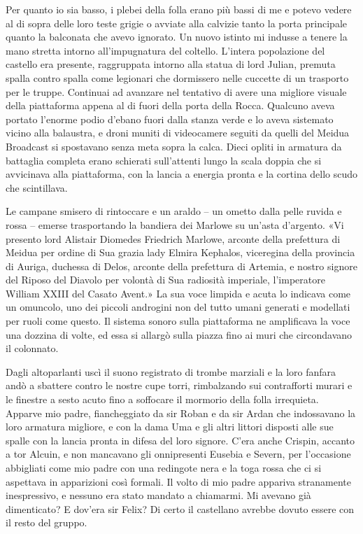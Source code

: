 Per quanto io sia basso, i plebei della folla erano più bassi di me e
potevo vedere al di sopra delle loro teste grigie o avviate alla
calvizie tanto la porta principale quanto la balconata che avevo
ignorato. Un nuovo istinto mi indusse a tenere la mano stretta intorno
all'impugnatura del coltello. L'intera popolazione del castello era
presente, raggruppata intorno alla statua di lord Julian, premuta spalla
contro spalla come legionari che dormissero nelle cuccette di un
trasporto per le truppe. Continuai ad avanzare nel tentativo di avere
una migliore visuale della piattaforma appena al di fuori della porta
della Rocca. Qualcuno aveva portato l'enorme podio d'ebano fuori dalla
stanza verde e lo aveva sistemato vicino alla balaustra, e droni muniti
di videocamere seguiti da quelli del Meidua Broadcast si spostavano
senza meta sopra la calca. Dieci opliti in armatura da battaglia
completa erano schierati sull'attenti lungo la scala doppia che si
avvicinava alla piattaforma, con la lancia a energia pronta e la cortina
dello scudo che scintillava.

Le campane smisero di rintoccare e un araldo -- un ometto dalla pelle
ruvida e rossa -- emerse trasportando la bandiera dei Marlowe su un'asta
d'argento. «Vi presento lord Alistair Diomedes {Friedrich} Marlowe,
arconte della prefettura di Meidua per ordine di Sua grazia lady Elmira
Kephalos, viceregina della provincia di Auriga, duchessa di Delos,
arconte della prefettura di Artemia, e nostro signore del Riposo del
Diavolo per volontà di Sua radiosità imperiale, l'imperatore William
XXIII del Casato Avent.» La sua voce limpida e acuta lo indicava come un
omuncolo, uno dei piccoli androgini non del tutto umani generati e
modellati per ruoli come questo. Il sistema sonoro sulla piattaforma ne
amplificava la voce una dozzina di volte, ed essa si allargò sulla
piazza fino ai muri che circondavano il colonnato.

Dagli altoparlanti uscì il suono registrato di trombe marziali e la loro
fanfara andò a sbattere contro le nostre cupe torri, rimbalzando sui
contrafforti murari e le finestre a sesto acuto fino a soffocare il
mormorio della folla irrequieta. Apparve mio padre, fiancheggiato da sir
Roban e da sir Ardan che indossavano la loro armatura migliore, e con la
dama Uma e gli altri littori disposti alle sue spalle con la lancia
pronta in difesa del loro signore. C'era anche Crispin, accanto a tor
Alcuin, e non mancavano gli onnipresenti Eusebia e Severn, per
l'occasione abbigliati come mio padre con una redingote nera e la toga
rossa che ci si aspettava in apparizioni così formali. Il volto di mio
padre appariva stranamente inespressivo, e nessuno era stato mandato a
chiamarmi. Mi avevano già dimenticato? E dov'era sir Felix? Di certo il
castellano avrebbe dovuto essere con il resto del gruppo.

